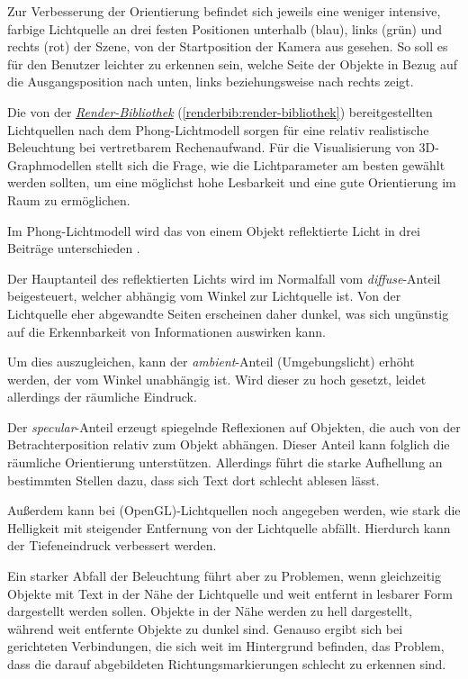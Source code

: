 \documentclass[a4paper,10pt]{sphinxmanual}
\begin{document}
Zur Verbesserung der Orientierung befindet sich jeweils eine weniger intensive, farbige Lichtquelle an drei festen Positionen unterhalb (blau), links (grün) und rechts (rot) der Szene, von der Startposition der Kamera aus gesehen.
So soll es für den Benutzer leichter zu erkennen sein, welche Seite der Objekte in Bezug auf die Ausgangsposition nach unten, links beziehungsweise nach rechts zeigt.

Die von der {\hyperref[renderbib:render-bibliothek]{\emph{Render-Bibliothek}}} (\autoref*{renderbib:render-bibliothek}) bereitgestellten Lichtquellen nach dem Phong-Lichtmodell \cite{phong_illumination_1975} sorgen für eine relativ realistische Beleuchtung bei vertretbarem Rechenaufwand.
Für die Visualisierung von 3D-Graphmodellen stellt sich die Frage, wie die Lichtparameter am besten gewählt werden sollten, um eine möglichst hohe Lesbarkeit und eine gute Orientierung im Raum zu ermöglichen.

Im Phong-Lichtmodell wird das von einem Objekt reflektierte Licht in drei Beiträge unterschieden \cite{akenine-moller_real-time_2008}.

Der Hauptanteil des reflektierten Lichts wird im Normalfall vom \emph{diffuse}-Anteil beigesteuert, welcher abhängig vom Winkel zur Lichtquelle ist.
Von der Lichtquelle eher abgewandte Seiten erscheinen daher dunkel, was sich ungünstig auf die Erkennbarkeit von Informationen auswirken kann.

Um dies auszugleichen, kann der \emph{ambient}-Anteil (Umgebungslicht) erhöht werden, der vom Winkel unabhängig ist.
Wird dieser zu hoch gesetzt, leidet allerdings der räumliche Eindruck.

Der \emph{specular}-Anteil erzeugt spiegelnde Reflexionen auf Objekten, die auch von der Betrachterposition relativ zum Objekt abhängen.
Dieser Anteil kann folglich die räumliche Orientierung unterstützen.
Allerdings führt die starke Aufhellung an bestimmten Stellen dazu, dass sich Text dort schlecht ablesen lässt.

Außerdem kann bei (OpenGL)-Lichtquellen noch angegeben werden, wie stark die Helligkeit mit steigender Entfernung von der Lichtquelle abfällt.
Hierdurch kann der Tiefeneindruck verbessert werden.

Ein starker Abfall der Beleuchtung führt aber zu Problemen, wenn gleichzeitig Objekte mit Text in der Nähe der Lichtquelle und weit entfernt in lesbarer Form dargestellt werden sollen.
Objekte in der Nähe werden zu hell dargestellt, während weit entfernte Objekte zu dunkel sind.
Genauso ergibt sich bei gerichteten Verbindungen, die sich weit im Hintergrund befinden, das Problem, dass die darauf abgebildeten Richtungsmarkierungen schlecht zu erkennen sind.
\end{document}
